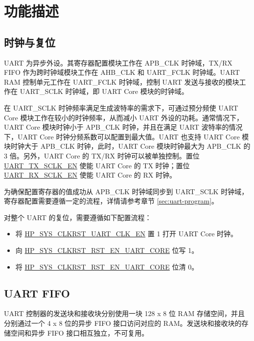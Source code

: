 \documentclass[main\_\_CN.tex]{subfiles}
\begin{document}
\clearpage
\section{功能描述}

\subsection{时钟与复位}
UART 为异步外设。其寄存器配置模块工作在 APB\_CLK 时钟域，TX/RX FIFO 作为跨时钟域模块工作在 AHB\_CLK 和 UART\_FCLK 时钟域。UART RAM 控制单元工作在 UART\_FCLK 时钟域，控制 UART 发送与接收的模块工作在 UART\_SCLK 时钟域，即 UART Core 模块的时钟域。

在 UART\_SCLK 时钟频率满足生成波特率的需求下，可通过预分频使 UART Core 模块工作在较小的时钟频率，从而减小 UART 外设的功耗。通常情况下，UART Core 模块时钟小于 APB\_CLK 时钟，并且在满足 UART 波特率的情况下，UART Core 时钟分频系数可以配置到最大值。UART 也支持 UART Core 模块时钟大于 APB\_CLK 时钟，此时，UART Core 模块时钟最大为 APB\_CLK 的 3 倍。另外，UART Core 的 TX/RX 时钟可以被单独控制。置位 \hyperref[fielddesc:UARTTXSCLKEN]{UART\_TX\_SCLK\_EN} 使能 UART Core 的 TX 时钟；置位 \hyperref[fielddesc:UARTRXSCLKEN]{UART\_RX\_SCLK\_EN} 使能 UART Core 的 RX 时钟。

为确保配置寄存器的值成功从 APB\_CLK 时钟域同步到 UART\_SCLK 时钟域，寄存器配置需要遵循一定的流程，详情请参考章节 \ref{sec:uart-program}。

对整个 UART 的复位，需要遵循如下配置流程：
\begin{itemize}
    \item 将 \hyperref[fielddesc:HPSYSCLKRSTUART0CLKEN]{HP\_SYS\_CLKRST\_UART\_CLK\_EN} 置 1 打开 UART Core 时钟。
    \item 向 \hyperref[fielddesc:HPSYSCLKRSTRSTENUART0CORE]{HP\_SYS\_CLKRST\_RST\_EN\_UART\_CORE} 位写 1。
    \item 将 \hyperref[fielddesc:HPSYSCLKRSTRSTENUART0CORE]{HP\_SYS\_CLKRST\_RST\_EN\_UART\_CORE} 位清 0。
\end{itemize}


\subsection{UART FIFO}


UART 控制器的发送块和接收块分别使用一块 128 x 8 位 RAM 存储空间，并且分别通过一个 4 x 8 位的异步 FIFO 接口访问对应的 RAM。发送块和接收块的存储空间和异步 FIFO 接口相互独立，不可复用。
\end{document}

